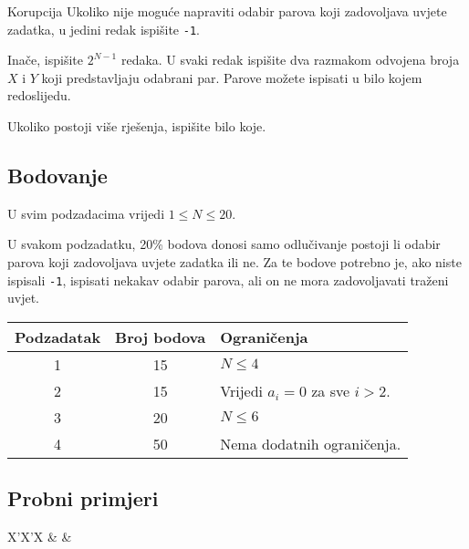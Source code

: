 \begin{statement}[
  problempoints=100,
  timelimit=1 sekunda,
  memorylimit= 512 MiB,
]{Korupcija}
Ukoliko nije moguće napraviti odabir parova koji zadovoljava uvjete zadatka, 
u jedini redak ispišite \texttt{-1}. 

Inače, ispišite $2^{N-1}$ redaka. U svaki redak ispišite dva razmakom odvojena broja $X$ i $Y$ 
koji predstavljaju odabrani par. Parove možete ispisati u bilo kojem redoslijedu.

Ukoliko postoji više rješenja, ispišite bilo koje. 

\subsection*{Bodovanje}

U svim podzadacima vrijedi $1 \leq N \leq 20$. 

U svakom podzadatku, 20\% bodova donosi samo odlučivanje
postoji li odabir parova koji zadovoljava uvjete zadatka ili ne.  
Za te bodove potrebno je, ako niste ispisali \texttt{-1}, ispisati nekakav 
odabir parova, ali on ne mora zadovoljavati traženi uvjet.


{\renewcommand{\arraystretch}{1.4}
  \setlength{\tabcolsep}{6pt}
  \begin{tabular}{ccl}
   Podzadatak & Broj bodova & Ograničenja \\ \midrule
    1 & 15 & $N \leq 4$ \\
    2 & 15 & Vrijedi $a_i = 0$ za sve $i > 2$. \\
    3 & 20 & $N \leq 6$\\
    4 & 50 & Nema dodatnih ograničenja. \\
\end{tabular}}

\subsection*{Probni primjeri}
\begin{tabularx}{\textwidth}{X'X'X}
 &
 &
\end{tabularx}

\end{statement}

